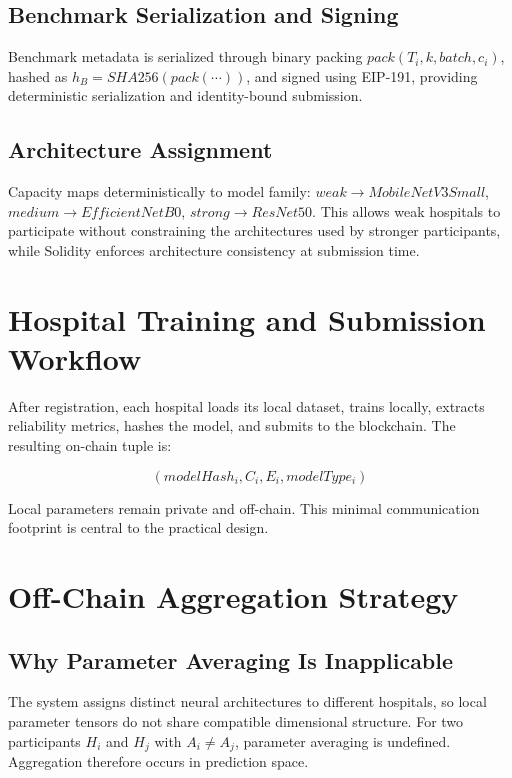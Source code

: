 \documentclass[conference]{IEEEtran}
\begin{document}
\subsection{Benchmark Serialization and Signing}

Benchmark metadata is serialized through binary packing $pack(T_i,k,batch,c_i)$, hashed as $h_B = SHA256(pack(\cdots))$, and signed using EIP-191, providing deterministic serialization and identity-bound submission.

\subsection{Architecture Assignment}

Capacity maps deterministically to model family: $weak \rightarrow MobileNetV3Small$, $medium \rightarrow EfficientNetB0$, $strong \rightarrow ResNet50$. This allows weak hospitals to participate without constraining the architectures used by stronger participants, while Solidity enforces architecture consistency at submission time.

\section{Hospital Training and Submission Workflow}

After registration, each hospital loads its local dataset, trains locally, extracts reliability metrics, hashes the model, and submits to the blockchain. The resulting on-chain tuple is:

\begin{equation}
(modelHash_i,C_i,E_i,modelType_i)
\end{equation}

Local parameters remain private and off-chain. This minimal communication footprint is central to the practical design.

\section{Off-Chain Aggregation Strategy}

\subsection{Why Parameter Averaging Is Inapplicable}

The system assigns distinct neural architectures to different hospitals, so local parameter tensors do not share compatible dimensional structure. For two participants $H_i$ and $H_j$ with $A_i \neq A_j$, parameter averaging is undefined. Aggregation therefore occurs in prediction space.
\end{document}
